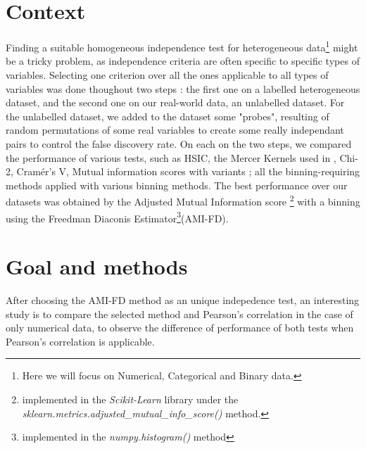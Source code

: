 \documentclass[
10pt, %
a4paper, %
oneside, %
headinclude,footinclude, %
BCOR5mm, %
]{scrartcl}
\begin{document}



\section{Context}
Finding a suitable homogeneous independence test for heterogeneous data\footnote{Here we will focus on Numerical, Categorical and Binary data.} might be a tricky problem, as independence criteria are often specific to specific types of variables. Selecting one criterion over all the ones applicable to all types of variables was done thoughout two steps : the first one on a labelled heterogeneous dataset, and the second one on our real-world data, an unlabelled dataset. For the unlabelled dataset, we added to the dataset some "probes", resulting of random permutations of some real variables to create some really independant pairs to control the false discovery rate. On each on the two steps, we compared the performance of various tests, such as HSIC, the Mercer Kernels used in \cite{bach2002learning}, Chi-2, Cramér's V, Mutual information scores with variants ; all the binning-requiring methods applied with various binning methods. The best performance over our datasets was obtained by the Adjusted Mutual Information score \cite{vinh2010information}\footnote{implemented in the \textit{Scikit-Learn} \cite{scikit-learn} library under the \textit{sklearn.metrics.adjusted\_mutual\_info\_score()} method.} with a binning using the Freedman Diaconis Estimator\footnote{implemented in the \textit{numpy.histogram()} method}(AMI-FD). 
 
\section{Goal and methods}
After choosing the AMI-FD method as an unique indepedence test, an interesting study is to compare the selected method and Pearson's correlation in the case of only numerical data, to observe the difference of performance of both tests when Pearson's correlation is applicable.





\renewcommand{\refname}{\spacedlowsmallcaps{References}} %




\end{document}
